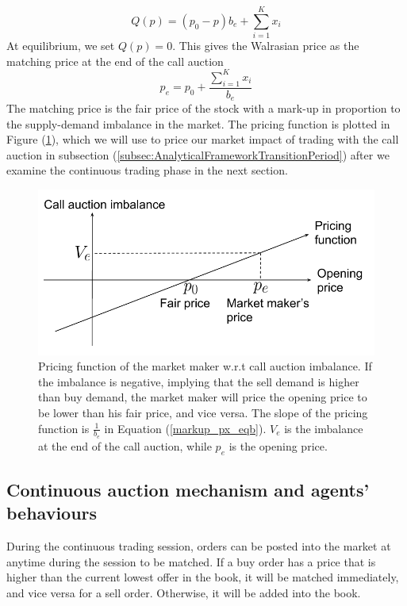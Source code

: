 \[
  Q(p) = (p_0 - p) b_e + \sum_{i=1}^K x_i
\]
At equilibrium, we set $Q(p)=0$. This gives the Walrasian price as the matching price at the end of the call auction
\begin{equation}\label{markup_px_eqb}
  p_e = p_0 + \frac{\sum_{i=1}^K x_i}{b_e}
\end{equation}
The matching price is the fair price of the stock with a mark-up in proportion to the supply-demand imbalance in the market. The pricing function is plotted in Figure (\ref{fig:mm_pricing_auction}), which we will use to price our market impact of trading with the call auction in subsection (\ref{subsec:AnalyticalFrameworkTransitionPeriod}) after we examine the continuous trading phase in the next section.

\begin{figure}[h]
  \includegraphics[width=\textwidth]{images/MMPricing}
  \caption{Pricing function of the market maker w.r.t call auction imbalance. If the imbalance is negative, implying that the sell demand is higher than buy demand, the market maker will price the opening price to be lower than his fair price, and vice versa. The slope of the pricing function is $\frac{1}{b_e}$ in Equation (\ref{markup_px_eqb}). $V_e$ is the imbalance at the end of the call auction, while $p_e$ is the opening price. }
  \label{fig:mm_pricing_auction}
\end{figure}

\subsection{Continuous auction mechanism and agents' behaviours}\label{subsec:AnalyticalFrameworkContinuousAuction}
During the continuous trading session, orders can be posted into the market at anytime during the session to be matched. If a buy order has a price that is higher than the current lowest offer in the book, it will be matched immediately, and vice versa for a sell order. Otherwise, it will be added into the book.

